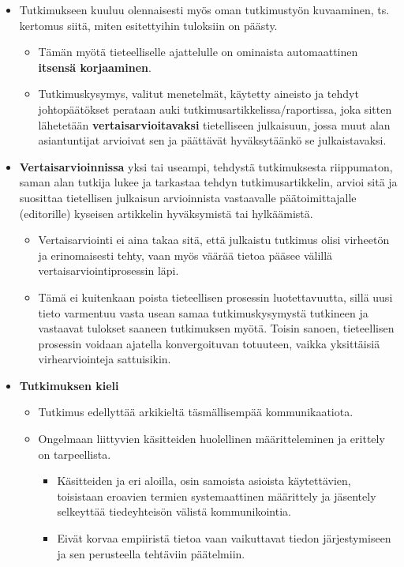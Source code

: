 \documentclass[
]{book}
\providecommand{\tightlist}{%
  \setlength{\itemsep}{0pt}\setlength{\parskip}{0pt}}
\begin{document}
\hfill\break
\hfill\break

\begin{itemize}
\tightlist
\item
  Tutkimukseen kuuluu olennaisesti myös oman tutkimustyön kuvaaminen, ts. kertomus siitä, miten esitettyihin tuloksiin on päästy.

  \begin{itemize}
  \tightlist
  \item
    Tämän myötä tieteelliselle ajattelulle on ominaista automaattinen \textbf{itsensä korjaaminen}.
  \item
    Tutkimuskysymys, valitut menetelmät, käytetty aineisto ja tehdyt johtopäätökset perataan auki tutkimusartikkelissa/raportissa, joka sitten lähetetään \textbf{vertaisarvioitavaksi} tietelliseen julkaisuun, jossa muut alan asiantuntijat arvioivat sen ja päättävät hyväksytäänkö se julkaistavaksi.
  \end{itemize}
\item
  \textbf{Vertaisarvioinnissa} yksi tai useampi, tehdystä tutkimuksesta riippumaton, saman alan tutkija lukee ja tarkastaa tehdyn tutkimusartikkelin, arvioi sitä ja suosittaa tietellisen julkaisun arvioinnista vastaavalle päätoimittajalle (editorille) kyseisen artikkelin hyväksymistä tai hylkäämistä.

  \begin{itemize}
  \tightlist
  \item
    Vertaisarviointi ei aina takaa sitä, että julkaistu tutkimus olisi virheetön ja erinomaisesti tehty, vaan myös väärää tietoa pääsee välillä vertaisarviointiprosessin läpi.
  \item
    Tämä ei kuitenkaan poista tieteellisen prosessin luotettavuutta, sillä uusi tieto varmentuu vasta usean samaa tutkimuskysymystä tutkineen ja vastaavat tulokset saaneen tutkimuksen myötä. Toisin sanoen, tieteellisen prosessin voidaan ajatella konvergoituvan totuuteen, vaikka yksittäisiä virhearviointeja sattuisikin.\\
  \end{itemize}
\item
  \textbf{Tutkimuksen kieli}

  \begin{itemize}
  \tightlist
  \item
    Tutkimus edellyttää arkikieltä täsmällisempää kommunikaatiota.
  \item
    Ongelmaan liittyvien käsitteiden huolellinen määritteleminen ja erittely on tarpeellista.

    \begin{itemize}
    \tightlist
    \item
      Käsitteiden ja eri aloilla, osin samoista asioista käytettävien, toisistaan eroavien termien systemaattinen määrittely ja jäsentely selkeyttää tiedeyhteisön välistä kommunikointia.
    \item
      Eivät korvaa empiiristä tietoa vaan vaikuttavat tiedon järjestymiseen ja sen perusteella tehtäviin päätelmiin.
    \end{itemize}
  \end{itemize}
\end{itemize}
\end{document}
